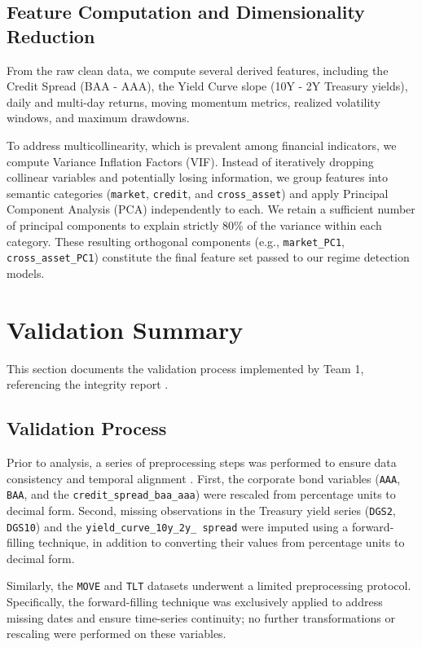\documentclass[a4paper,fleqn]{cas-sc}
\begin{document}
\subsection{Feature Computation and Dimensionality Reduction}
From the raw clean data, we compute several derived features, including the Credit Spread (BAA - AAA), the Yield Curve slope (10Y - 2Y Treasury yields), daily and multi-day returns, moving momentum metrics, realized volatility windows, and maximum drawdowns.

To address multicollinearity, which is prevalent among financial indicators, we compute Variance Inflation Factors (VIF). Instead of iteratively dropping collinear variables and potentially losing information, we group features into semantic categories (\texttt{market}, \texttt{credit}, and \texttt{cross\_asset}) and apply Principal Component Analysis (PCA) independently to each. We retain a sufficient number of principal components to explain strictly 80\% of the variance within each category. These resulting orthogonal components (e.g., \texttt{market\_PC1}, \texttt{cross\_asset\_PC1}) constitute the final feature set passed to our regime detection models.

\section{Validation Summary}

This section documents the validation process implemented by Team 1, referencing the integrity report \cite{team1_report}.

\subsection{Validation Process}
Prior to analysis, a series of preprocessing steps was performed to ensure data consistency and temporal alignment \cite{team1_script}. First, the corporate bond variables (\texttt{AAA}, \texttt{BAA}, and the \texttt{credit\_spread\_baa\_aaa}) were rescaled from percentage units to decimal form. Second, missing observations in the Treasury yield series (\texttt{DGS2}, \texttt{DGS10}) and the \texttt{yield\_curve\_10y\_2y\_ spread} were imputed using a forward-filling technique, in addition to converting their values from percentage units to decimal form.

Similarly, the \texttt{MOVE} and \texttt{TLT} datasets underwent a limited preprocessing protocol. Specifically, the forward-filling technique was exclusively applied to address missing dates and ensure time-series continuity; no further transformations or rescaling were performed on these variables.
\end{document}
